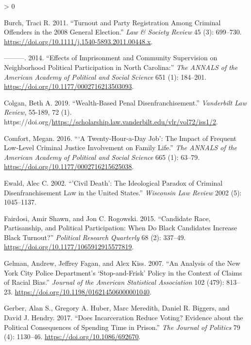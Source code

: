 \documentclass[
  12pt,
]{article}
\newlength{\cslhangindent}
\newenvironment{CSLReferences}[2] %
 {%
  \setlength{\parindent}{0pt}
  \ifodd #1 \everypar{\setlength{\hangindent}{\cslhangindent}}\ignorespaces\fi
  \ifnum #2 > 0
  \setlength{\parskip}{#2\baselineskip}
  \fi
 }%
 {}
\begin{document}
\begin{CSLReferences}{1}{0}
\leavevmode\hypertarget{ref-Burch2011}{}%
Burch, Traci R. 2011. {``Turnout and {Party Registration} Among {Criminal Offenders} in the 2008 {General Election}.''} \emph{Law \& Society Review} 45 (3): 699--730. \url{https://doi.org/10.1111/j.1540-5893.2011.00448.x}.

\leavevmode\hypertarget{ref-Burch2014}{}%
---------. 2014. {``Effects of {Imprisonment} and {Community Supervision} on {Neighborhood Political Participation} in {North Carolina}:''} \emph{The ANNALS of the American Academy of Political and Social Science} 651 (1): 184--201. \url{https://doi.org/10.1177/0002716213503093}.

\leavevmode\hypertarget{ref-Colgan2019}{}%
Colgan, Beth A. 2019. {``Wealth-{Based Penal Disenfranchisement}.''} \emph{Vanderbilt Law Review}, 55-189, 72 (1). https://doi.org/\url{https://scholarship.law.vanderbilt.edu/vlr/vol72/iss1/2}.

\leavevmode\hypertarget{ref-Comfort2016}{}%
Comfort, Megan. 2016. {``{`{A Twenty}-{Hour}-a-{Day Job}'}: {The Impact} of {Frequent Low}-{Level Criminal Justice Involvement} on {Family Life}.''} \emph{The ANNALS of the American Academy of Political and Social Science} 665 (1): 63--79. \url{https://doi.org/10.1177/0002716215625038}.

\leavevmode\hypertarget{ref-Ewald2002}{}%
Ewald, Alec C. 2002. {``'{Civil} Death': {The} Ideological Paradox of Criminal Disenfranchisement Law in the {United States}.''} \emph{Wisconsin Law Review} 2002 (5): 1045--1137.

\leavevmode\hypertarget{ref-Fairdosi2015}{}%
Fairdosi, Amir Shawn, and Jon C. Rogowski. 2015. {``Candidate {Race}, {Partisanship}, and {Political Participation}: {When Do Black Candidates Increase Black Turnout}?''} \emph{Political Research Quarterly} 68 (2): 337--49. \url{https://doi.org/10.1177/1065912915577819}.

\leavevmode\hypertarget{ref-Gelman2007}{}%
Gelman, Andrew, Jeffrey Fagan, and Alex Kiss. 2007. {``An {Analysis} of the {New York City Police Department}'s {`{Stop}-and-{Frisk}'} {Policy} in the {Context} of {Claims} of {Racial Bias}.''} \emph{Journal of the American Statistical Association} 102 (479): 813--23. \url{https://doi.org/10.1198/016214506000001040}.

\leavevmode\hypertarget{ref-Gerber2017}{}%
Gerber, Alan S., Gregory A. Huber, Marc Meredith, Daniel R. Biggers, and David J. Hendry. 2017. {``Does {Incarceration Reduce Voting}? {Evidence} about the {Political Consequences} of {Spending Time} in {Prison}.''} \emph{The Journal of Politics} 79 (4): 1130--46. \url{https://doi.org/10.1086/692670}.


\end{CSLReferences}
\end{document}
